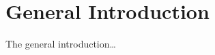 \chapter*{General Introduction}

\begin{spacing}{1.2}

The general introduction\dots


\end{spacing}


